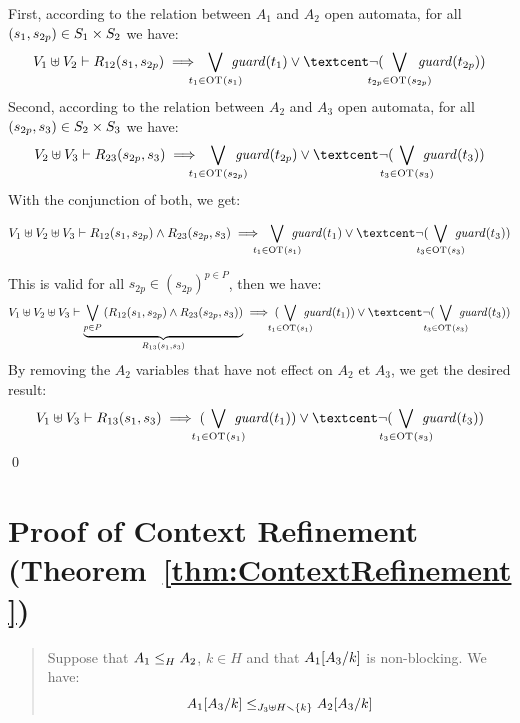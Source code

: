 \documentclass[runningheads]{llncs}
\begin{document}
\begin{enumerate}
First, according to the relation between $A_1$ and $A_2$ open automata,  for all $\mpar{s_1, s_{2p}} \in S_1\times S_2$  we have:
\begin{multline*}
V_1 \uplus V_2  \vdash R_{12}\mpar{s_1, s_{2p}} \implies \bigvee_\subbox{t_1 \in \fOT{s_1}} \fguard{t_1}  \lor¢ \lnot( \bigvee_\subbox{t_{2p} \in \fOT{s_{2p}}} \fguard{t_{2p}}  )
\end{multline*}
Second, according to the relation between $A_2$ and $A_3$ open automata, for all $\mpar{s_{2p},s_3} \in S_2\times S_3$  we have:
\begin{multline*}
 V_2 \uplus V_3  \vdash R_{23}\mpar{s_{2p},s_3} \implies  \bigvee_\subbox{t_1 \in \fOT{s_{2p}}} \fguard{t_{2p}}  \lor¢ \lnot( \bigvee_\subbox{t_3 \in \fOT{s_3}} \fguard{t_3} )
\end{multline*}
With the conjunction of both, we get:

\begin{multline*}
 V_1 \uplus V_2 \uplus V_3  \vdash  R_{12}\mpar{s_1, s_{2p}} \wedge R_{23}\mpar{s_{2p},s_3} \implies   \bigvee_\subbox{t_1 \in \fOT{s_1}} \fguard{t_1} 
 \lor¢ \lnot( \bigvee_\subbox{t_3 \in \fOT{s_3}} \fguard{t_3} )
\end{multline*}


This is valid for all $s_{2p} \in (s_{2p})^{p\in P}$, then we have:
\begin{multline*}
 V_1 \uplus V_2 \uplus V_3  \vdash \underbrace{\bigvee_{{p\in P}}\mpar{R_{12}\mpar{s_1, s_{2p}} \wedge R_{23}\mpar{s_{2p},s_3}}}_{R_{13}(s_1,s_3)} \implies  ( \bigvee_\subbox{t_1 \in \fOT{s_1}} \fguard{t_1} )
 \lor¢ \lnot( \bigvee_\subbox{t_3 \in \fOT{s_3}} \fguard{t_3} )
\end{multline*}
By removing the $A_2$ variables that have not effect on $A_2$ et $A_3$,
we get the desired result:
\begin{multline*}
 V_1 \uplus  V_3  \vdash R_{13}(s_1,s_3) \implies  ( \bigvee_\subbox{t_1 \in \fOT{s_1}} \fguard{t_1} )
 \lor¢ \lnot( \bigvee_\subbox{t_3 \in \fOT{s_3}} \fguard{t_3} )
\end{multline*}
\qed
\end{enumerate}
\section{Proof of Context Refinement (Theorem~\ref{thm:ContextRefinement})}
\begin{quote}
Suppose that $\wrel{A_1}{A_2}{H}$, \(k \in H\) and that \(A_1\subst{A_3}{k}\) is non-blocking. We have: 
\[\wrel{A_1\subst{A_3}{k}}{A_2\subst{A_3}{k}}{J_3 \uplus H \setminus \mbrc{k}}\]
\end{quote}
\smallskip
\end{document}
